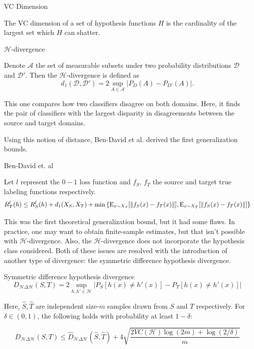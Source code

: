 \begin{definition}{VC Dimension}
	 
	 The VC dimension of a set of hypothesis functions $H$ is the cardinality of the largest set which $H$ can shatter.
	
\end{definition}

\begin{definition}{$\mathcal{H}$-divergence}
	
	Denote $\mathcal{A}$ the set of measurable subsets under two probability distributions $\mathcal{D}$ and $\mathcal{D'}$. Then the $\mathcal{H}$-divergence is defined as
	\[
	d_{1}(\mathcal{D},\mathcal{D'}) = 2 \sup_{A\in \mathcal{A}} \left| P_D(A)-P_{D'}(A) \right| .
	\]
\end{definition}

This one compares how two classifiers disagree on both domains. Here, it finds the pair of classifiers with the largest disparity in disagreements between the source and target domains.

Using this notion of distance, Ben-David et al. derived the first generalization bounds.

\begin{theorem}{Ben-David et. al}
	
	Let $l$ represent the $0-1$ loss function and $f_S,\,f_T$ the source and target true labeling functions respectively.
	\[
	R_T^{l}(h) \leq R_S^{l}(h) + d_1(X_S,X_T) + \min \left\{ \mathrm{E}_{x\sim X_S} [\left\|f_S(x)-f_T(x)\right\|], \mathrm{E}_{x\sim X_T} [\left\|f_S(x)-f_T(x)\right\|] \right\}
	\]

\end{theorem}

This was the first theoretical generalization bound, but it had some flaws. In practice, one may want to obtain finite-sample estimates, but that isn't possible with $\mathcal{H}$-divergence. Also, the $\mathcal{H}$-divergence does not incorporate the hypothesis class considered. Both of these issues are resolved with the introduction of another type of divergence: the symmetric difference hypothesis divergence.

\begin{definition}{Symmetric difference hypothesis divergence}
	\[
	D_{\mathcal{H}\Delta \mathcal{H}}(S,T) = 
	2 \sup_{h,h'\in \mathcal{H}} \left| P_S[h(x)\neq h'(x)] - P_T[h(x)\neq h'(x)] \right| 
	\]
\end{definition}

\begin{theorem}
	Here, $\hat{S},\hat{T}$ are independent size-$m$ samples drawn from $S$ and $T$ respectively. For $\delta\in (0,1)$, the following holds with probability at least $1-\delta$:
	
	\[
	D_{\mathcal{H}\Delta \mathcal{H}}(S,T) \leq \hat{D}_{\mathcal{H}\Delta \mathcal{H}}(\hat{S},\hat{T}) + 
	4 \sqrt{\frac{2 VC(\mathcal{H}) \log(2m) + \log(2/\delta)}{m}}
	\]
\end{theorem}

